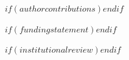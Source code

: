
$if(authorcontributions)$$endif$



$if(fundingstatement)$$endif$


$if(institutionalreview)$$endif$

